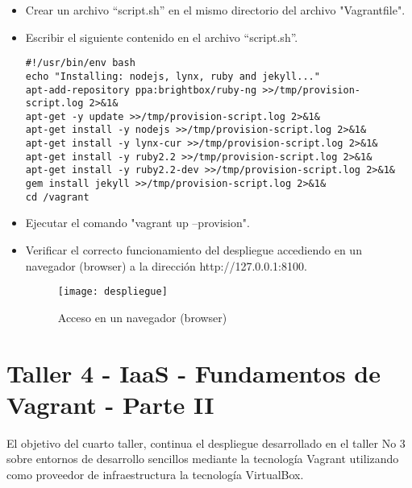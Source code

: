 \documentclass[10pt]{article}   			%
\begin{document}
\begin{itemize}
\item Crear un archivo “script.sh” en el mismo directorio del archivo "Vagrantfile".
\item Escribir el siguiente contenido en el archivo “script.sh”.
	
\begin{small}
	\begin{lstlisting}[frame=single,style=base]	
#!/usr/bin/env bash
echo "Installing: nodejs, lynx, ruby and jekyll..."
apt-add-repository ppa:brightbox/ruby-ng >>/tmp/provision-script.log 2>&1&
apt-get -y update >>/tmp/provision-script.log 2>&1&
apt-get install -y nodejs >>/tmp/provision-script.log 2>&1&
apt-get install -y lynx-cur >>/tmp/provision-script.log 2>&1&
apt-get install -y ruby2.2 >>/tmp/provision-script.log 2>&1&
apt-get install -y ruby2.2-dev >>/tmp/provision-script.log 2>&1&
gem install jekyll >>/tmp/provision-script.log 2>&1&
cd /vagrant
	\end{lstlisting}
	\end{small}

\item Ejecutar el comando "vagrant up --provision".
\item Verificar el correcto funcionamiento del despliegue accediendo en un navegador (browser) a la dirección http://127.0.0.1:8100.
\begin{figure}[ht] 
	\centering
		\texttt{[image: despliegue]}   
	\caption{  Acceso en un navegador (browser)} \label{fig:despliegue}
\end{figure}

\end{itemize}

\newpage %
		
\section{Taller 4 - IaaS - Fundamentos de Vagrant - Parte II}

El objetivo del cuarto taller, continua el despliegue desarrollado en el taller No 3 sobre entornos de desarrollo sencillos mediante la tecnología Vagrant utilizando como proveedor de infraestructura la tecnología VirtualBox.
		
\end{document}
